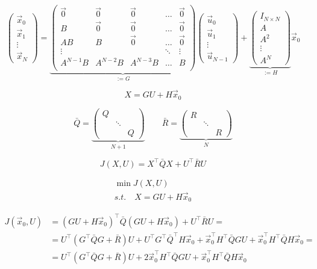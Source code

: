\documentclass{article}
\begin{document}
$$
\begin{pmatrix}\vec{x}_0\\ \vec{x}_1 \\ \vdots \\ \vec{x}_N\end{pmatrix} =
\underbrace{\begin{pmatrix}
\vec{0}  & \vec{0}  & \vec{0}  & \dots  & \vec{0} \\
B        & \vec{0}  & \vec{0}  & \dots  & \vec{0} \\
AB       & B        & \vec{0}  & \dots  & \vec{0} \\
\vdots   &          &          & \ddots & \vdots  \\
A^{N-1}B & A^{N-2}B & A^{N-3}B & \dots  & B       \\
\end{pmatrix}}_{:= G}
\begin{pmatrix}\vec{u}_0\\ \vec{u}_1 \\ \vdots \\ \vec{u}_{N-1}\end{pmatrix} 
+
\underbrace{\begin{pmatrix}I_{N\times N}\\A\\A^2\\\vdots\\A^N\end{pmatrix}}_{:= H}\vec{x}_0
$$

$$
X=GU + H\vec{x}_0
$$

$$
\bar{Q} = \underbrace{\begin{pmatrix}Q & & \\ & \ddots & \\ & & Q\end{pmatrix}}_{N+1}
\qquad
\bar{R} = \underbrace{\begin{pmatrix}R & & \\ & \ddots & \\ & & R\end{pmatrix}}_{N}
$$

$$
J(X,U) = X^\top\bar{Q}X + U^\top\bar{R}U
$$


$$
\begin{array}{l}
\min J(X,U)\\
s.t.\quad X=GU + H\vec{x}_0
\end{array}
$$
\fi

\begin{align*}
J(\vec{x}_0, U) & = (GU + H\vec{x}_0)^\top\bar{Q}(GU + H\vec{x}_0)+U^\top\bar{R}U=\\
& = U^\top(G^\top\bar{Q}G + \bar{R})U + U^\top G^\top \bar{Q}^\top H\vec{x}_0 + \vec{x}_0^\top H^\top \bar{Q} G U + \vec{x}_0^\top H^\top \bar{Q} H \vec{x}_0 = \\
& = U^\top(G^\top\bar{Q}G + \bar{R})U + 2 \vec{x}_0^\top H^\top \bar{Q} G U + \vec{x}_0^\top H^\top \bar{Q} H \vec{x}_0 
\end{align*}
\end{document}
